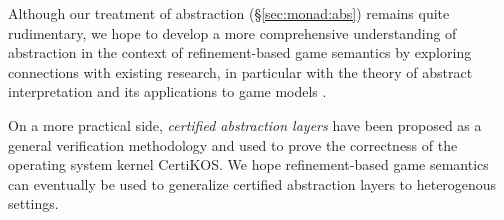 \documentclass[sigplan,10pt,review,anonymous]{acmart}
\begin{document}
Although our treatment of abstraction (\S\ref{sec:monad:abs})
remains quite rudimentary,
we hope to develop a more comprehensive understanding
of abstraction in the context of refinement-based game semantics
by exploring connections with existing research,
in particular with
the theory of abstract interpretation \cite{absint,aif}
and its applications to game models \cite{aigp}.

On a more practical side,
\emph{certified abstraction layers} \cite{popl15,osdi16,ccal}
have been proposed as a general verification methodology
and used to prove the correctness of the operating system kernel CertiKOS.
We hope refinement-based game semantics
can eventually be used to generalize
certified abstraction layers to heterogenous settings.


%
%
%

%




\end{document}

